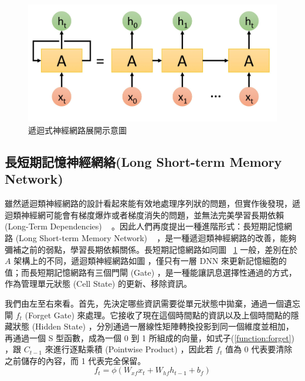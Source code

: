 \begin{figure}
    \centering
    \includegraphics[scale=0.18]{images/chap2_unrollrnn.png}
    \caption{遞迴式神經網路展開示意圖}\label{fig:chap2_unrollrnn}
\end{figure}

\subsection{長短期記憶神經網絡(Long Short-term Memory Network)}
雖然遞迴類神經網路的設計看起來能有效地處理序列狀的問題，但實作後發現，遞迴類神經網可能會有梯度爆炸或者梯度消失的問題，並無法完美學習長期依賴 (Long-Term Dependencies) ~\cite{bengio1994learning} 。因此人們再度提出一種進階形式：長短期記憶網路 (Long Short-term Memory Network) ~\cite{hochreiter1997long} ，是一種遞迴類神經網路的改善，能夠彌補之前的弱點，學習長期依賴關係。長短期記憶網路如同圖 ~\ref{fig:chap2_unrollrnn} 一般，差別在於 $A$ 架構上的不同，遞迴類神經網路如圖 %
，僅只有一層 DNN 來更新記憶細胞的值；而長短期記憶網路有三個門閘 (Gate) ，是一種能讓訊息選擇性通過的方式，作為管理單元狀態 (Cell State) 的更新、移除資訊。

我們由左至右來看。首先，先決定哪些資訊需要從單元狀態中拋棄，通過一個遺忘閘 $f_t$ (Forget Gate) 來處理。它接收了現在這個時間點的資訊以及上個時間點的隱藏狀態 (Hidden State) ，分別通過一層線性矩陣轉換投影到同一個維度並相加，再通過一個 S 型函數，成為一個 0 到 1 所組成的向量，如式子(\ref{function:forget}) ，跟 $C_{t-1}$ 來進行逐點乘積 (Pointwise Product) ，因此若 $f_t$ 值為 0 代表要清除之前儲存的內容，而 1 代表完全保留。
\begin{equation}
    f_t = \phi(W_{xf}x_t + W_{hf}h_{t-1} + b_f) \label{function:forget}
\end{equation}

